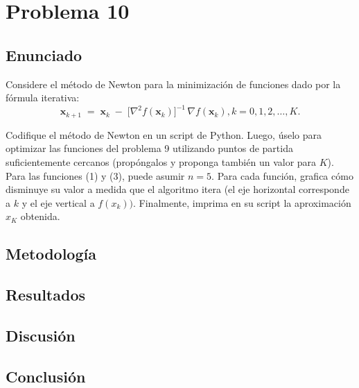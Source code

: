 \documentclass{article}
\begin{document}
\section{Problema 10}

\subsection{Enunciado}
Considere el método de Newton para la minimización de funciones dado por la fórmula iterativa:
\begin{equation*}
    \mathbf{x}_{k+1} \;=\; \mathbf{x}_{k} \;-\; \bigl[\nabla^{2} f(\mathbf{x}_{k})\bigr]^{-1}\,\nabla f(\mathbf{x}_{k}), k=0,1,2,\dots,K.
\end{equation*}

Codifique el método de Newton en un script de Python. Luego, úselo para optimizar las funciones del problema 9 utilizando puntos de partida suficientemente cercanos (propóngalos y proponga también un valor para $K$). Para las funciones (1) y (3), puede asumir $n = 5$. Para cada función, grafica cómo disminuye su valor a medida que el algoritmo itera (el eje horizontal corresponde a $k$ y el eje vertical a $f(x_k))$. Finalmente, imprima en su script la aproximación $x_K$ obtenida.

\subsection{Metodología}

\subsection{Resultados}
\setcounter{equation}{0}

\subsection{Discusión}

\subsection{Conclusión}
\end{document}
